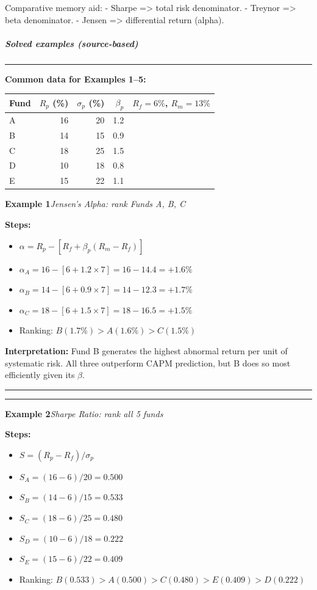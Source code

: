 \documentclass[
]{article}
\begin{document}
Comparative memory aid: - Sharpe =\textgreater{} total risk denominator.
- Treynor =\textgreater{} beta denominator. - Jensen =\textgreater{}
differential return (alpha).

\hypertarget{solved-examples-source-based-8}{%
\subparagraph{Solved examples
(source-based)}\label{solved-examples-source-based-8}}


\medskip
\noindent\rule{\linewidth}{0.4pt}

\noindent\textbf{Common data for Examples 1--5:}
\begin{center}
\begin{tabular}{|l|r|r|r|r|}
\hline
\textbf{Fund} & \textbf{$R_p$ (\%)} & \textbf{$\sigma_p$ (\%)} & \textbf{$\beta_p$} & \textbf{$R_f=6\%$, $R_m=13\%$}\\
\hline
A & 16 & 20 & 1.2 & \\
B & 14 & 15 & 0.9 & \\
C & 18 & 25 & 1.5 & \\
D & 10 & 18 & 0.8 & \\
E & 15 & 22 & 1.1 & \\
\hline
\end{tabular}
\end{center}

\noindent\textbf{Example 1}\enspace\textit{Jensen's Alpha: rank Funds A, B, C}

\noindent\textbf{Steps:}
\begin{itemize}\setlength{\itemsep}{3pt}
  \item $\alpha = R_p - [R_f + \beta_p(R_m - R_f)]$
  \item $\alpha_A = 16 - [6 + 1.2\times7] = 16 - 14.4 = +1.6\%$
  \item $\alpha_B = 14 - [6 + 0.9\times7] = 14 - 12.3 = +1.7\%$
  \item $\alpha_C = 18 - [6 + 1.5\times7] = 18 - 16.5 = +1.5\%$
  \item Ranking: $B (1.7\%) > A (1.6\%) > C (1.5\%)$
\end{itemize}

\noindent\textbf{Interpretation:} Fund B generates the highest abnormal return per unit of systematic risk. All three outperform CAPM prediction, but B does so most efficiently given its $\beta$.

\noindent\rule{\linewidth}{0.4pt}
\medskip
\noindent\rule{\linewidth}{0.4pt}
\noindent\textbf{Example 2}\enspace\textit{Sharpe Ratio: rank all 5 funds}

\noindent\textbf{Steps:}
\begin{itemize}\setlength{\itemsep}{3pt}
  \item $S = (R_p - R_f)/\sigma_p$
  \item $S_A = (16-6)/20 = 0.500$
  \item $S_B = (14-6)/15 = 0.533$
  \item $S_C = (18-6)/25 = 0.480$
  \item $S_D = (10-6)/18 = 0.222$
  \item $S_E = (15-6)/22 = 0.409$
  \item Ranking: $B(0.533) > A(0.500) > C(0.480) > E(0.409) > D(0.222)$
\end{itemize}
\end{document}
